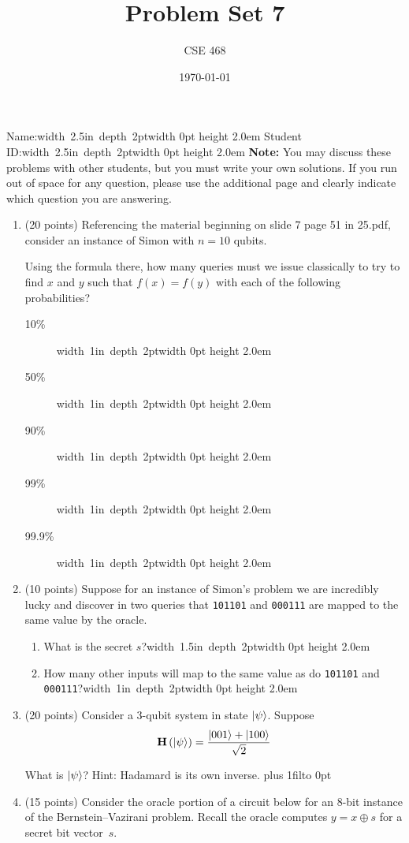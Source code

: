 \documentclass[12pt]{article}
\title{Problem Set 7}
\author{CSE 468}
\date{\today}
\newcommand{\Blank}[1][1in]{\mbox{\hskip 4pt\vrule width #1 depth 2pt}\vrule width 0pt height 2.0em}
\newcommand{\NameBlank}{\mbox{\hskip 4pt\vrule width 2.5in depth 2pt}\vrule width 0pt height 2.0em}
\def\DefaultSpace{1in}
\newcommand{\LeaveSpace}[1][\DefaultSpace]{%
\vskip #1 plus 1fil\relax\hbox to 0pt{\hss} %
}
\begin{document}
\maketitle

\noindent Name:\NameBlank{} \newline
\noindent Student ID:\NameBlank{} \newline
\textbf{Note:} You may discuss these problems with other students, but you must write your own solutions. If you run out of space for any question, please use the additional page and clearly indicate which question you are answering.

\begin{enumerate}[font=\bfseries]

\item (20 points) Referencing the material beginning on slide 7 page 51 in 25.pdf, consider an instance of Simon with $n=10$ qubits.  

Using the formula there, how many queries must we issue classically to try to find $x$ and $y$ such that $f(x)=f(y)$ with each of the following probabilities?
\begin{description}
    \item[10\%] \Blank{}
    \item[50\%] \Blank{}
    \item[90\%] \Blank{}
    \item[99\%] \Blank{}
    \item[99.9\%] \Blank{}
\end{description}
\item(10 points) Suppose for an instance of Simon's problem we are incredibly lucky and discover in two queries that \texttt{101101} and \texttt{000111} are mapped to the same value by the oracle.  \begin{enumerate}
    \item What is the secret $s$?\Blank[1.5in]{}
    \item How many other inputs will map to the same value as do \texttt{101101} and \texttt{000111}?\Blank{}
\end{enumerate}

\item (20 points) Consider a 3-qubit system in state $\ket{\psi}$.  Suppose \[ \textbf{H}\left(\ket{\psi}\right)=\frac{\ket{001}+\ket{100}}{\sqrt{2}}\] 

What is $\ket{\psi}$? 
Hint: Hadamard is its own inverse.
\LeaveSpace{}

    \item (15 points) Consider the oracle portion of a circuit below for an $8$-bit instance of the Bernstein--Vazirani problem.  Recall the oracle computes $y=x\oplus s$ for a secret bit vector~$s$.
    

\end{enumerate}
\end{document}
